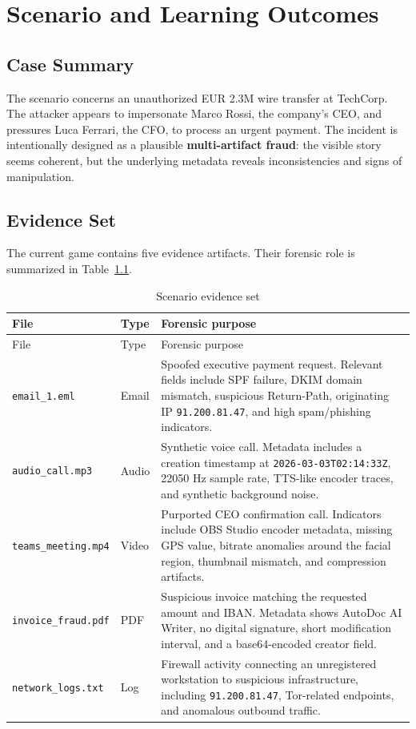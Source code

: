 \chapter{Scenario and Learning Outcomes}

\section{Case Summary}

The scenario concerns an unauthorized EUR 2.3M wire transfer at TechCorp. The attacker appears to impersonate Marco Rossi, the company's CEO, and pressures Luca Ferrari, the CFO, to process an urgent payment. The incident is intentionally designed as a plausible \textbf{multi-artifact fraud}: the visible story seems coherent, but the underlying metadata reveals inconsistencies and signs of manipulation.

\section{Evidence Set}

The current game contains five evidence artifacts. Their forensic role is summarized in Table~\ref{tab:evidence}.

\begin{longtable}{p{}p{}p{}}
\caption{Scenario evidence set}
\label{tab:evidence}\\
\toprule
File & Type & Forensic purpose \\
\midrule
\endfirsthead
\toprule
File & Type & Forensic purpose \\
\midrule
\endhead
\texttt{email\_1.eml} & Email & Spoofed executive payment request. Relevant fields include SPF failure, DKIM domain mismatch, suspicious Return-Path, originating IP \texttt{91.200.81.47}, and high spam/phishing indicators. \\
\texttt{audio\_call.mp3} & Audio & Synthetic voice call. Metadata includes a creation timestamp at \texttt{2026-03-03T02:14:33Z}, 22050 Hz sample rate, TTS-like encoder traces, and synthetic background noise. \\
\texttt{teams\_meeting.mp4} & Video & Purported CEO confirmation call. Indicators include OBS Studio encoder metadata, missing GPS value, bitrate anomalies around the facial region, thumbnail mismatch, and compression artifacts. \\
\texttt{invoice\_fraud.pdf} & PDF & Suspicious invoice matching the requested amount and IBAN. Metadata shows AutoDoc AI Writer, no digital signature, short modification interval, and a base64-encoded creator field. \\
\texttt{network\_logs.txt} & Log & Firewall activity connecting an unregistered workstation to suspicious infrastructure, including \texttt{91.200.81.47}, Tor-related endpoints, and anomalous outbound traffic. \\
\bottomrule
\end{longtable}

